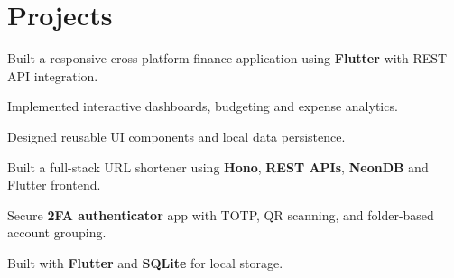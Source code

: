 \documentclass[]{deedy-resume-reversed}
\begin{document}
\begin{minipage}[t]{0.60\textwidth}
\section{Projects}

\begin{tightemize}
\item Built a responsive cross-platform finance application using \textbf{Flutter} with REST API integration.
\item Implemented interactive dashboards, budgeting and expense analytics.
\item Designed reusable UI components and local data persistence.
\end{tightemize}
\sectionsep

\begin{tightemize}
\item Built a full-stack URL shortener using \textbf{Hono}, \textbf{REST APIs}, \textbf{NeonDB} and Flutter frontend.
\end{tightemize}
\sectionsep

\begin{tightemize}
\item Secure \textbf{2FA authenticator} app with TOTP, QR scanning, and folder-based account grouping.
\item Built with \textbf{Flutter} and \textbf{SQLite} for local storage.
\end{tightemize}
\sectionsep

\end{minipage}
\hfill
\end{document}
